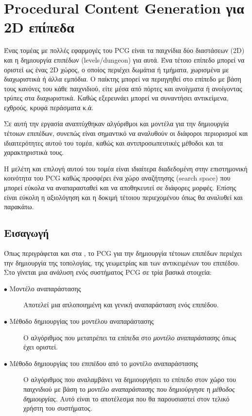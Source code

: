 \section{Procedural Content Generation για 2D επίπεδα}

Ένας τομέας με πολλές εφαρμογές του PCG είναι τα παιχνίδια δύο διαστάσεων (2D) και η δημιουργία επιπέδων (levels/dungeon) για αυτά. Ένα τέτοιο επίπεδο μπορεί να οριστεί ως ένας 2D χώρος, ο οποίος περιέχει δωμάτια ή τμήματα, χωρισμένα με διαχωριστικά ή άλλα εμπόδια. Ο παίκτης μπορεί να περιηγηθεί στο επίπεδο με βάση τους κανόνες του κάθε παιχνιδιού, είτε μέσα από πόρτες και ανοίγματα ή ανοίγοντας τρύπες στα διαχωριστικά. Καθώς εξερευνάει μπορεί να συναντήσει αντικείμενα, εχθρούς, κρυφά περάσματα κ.ά. 
\par
Σε αυτή την εργασία αναπτύχθηκαν αλγόριθμοι και μοντέλα για την δημιουργία τέτοιων επιπέδων, συνεπώς είναι σημαντικό να αναλυθούν οι διάφοροι περιορισμοί και ιδιαιτερότητες αυτού του τομέα, καθώς και αντιπροσωπευτικές μέθοδοι και τα χαρακτηριστικά τους.
\par
Η μελέτη και επιλογή αυτού του τομέα είναι ιδιαίτερα διαδεδομένη στην επιστημονική κοινότητα του PCG καθώς προσφέρει ένα χώρο αναζήτησης (search space) που μπορεί εύκολα να αναπαρασταθεί και να αποθηκευτεί σε διάφορες μορφές. Επίσης είναι εύκολη η αξιολόγηση και η δοκιμή τέτοιου περιεχομένου όπως θα αναλυθεί και παρακάτω.

\subsection{Εισαγωγή}
Όπως περιγράφεται και στα \cite{pcgieee} \cite{pcgig}, το PCG για την δημιουργία τέτοιων επιπέδων περιέχει την δημιουργία της τοπολογίας, της γεωμετρίας και των αντικειμένων του επιπέδου. Στο \cite{pcgig} γίνεται μια ανάλυση ενός συστήματος PCG σε τρία βασικά στοιχεία:

\begin{description}
  \item[$\bullet$ Μοντέλο αναπαράστασης] Αποτελεί μια απλοποιημένη και γενική αναπαράσταση ενός επιπέδου.
  \item[$\bullet$ Μέθοδο δημιουργίας του μοντέλου αναπαράστασης] Ο αλγόριθμος που μετατρέπει τα επίπεδα στο \textit{μοντέλο αναπαράστασης} όπως έχει οριστεί. 
    \item[$\bullet$ Μέθοδο δημιουργίας του επιπέδου από το μοντέλο αναπαράστασης] Ο αλγόριθμος που αναλαμβάνει να δημιουργήσει το επίπεδο στον χώρο του παιχνιδιού με βάση το \textit{μοντέλο αναπαράστασης} που δημιούργησε η \textit{μέθοδος δημιουργίας}. Αυτό είναι το αποτέλεσμα που θα παρουσιαστεί στον τελικό χρήστη του συστήματος.
\end{description}

